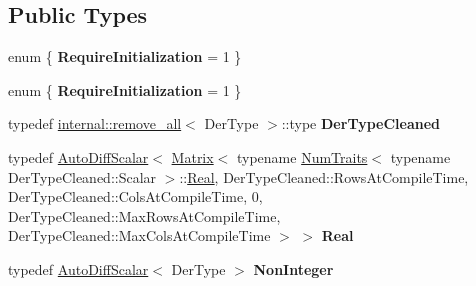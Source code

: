 \subsection*{Public Types}
\begin{DoxyCompactItemize}
\item 
\mbox{\label{struct_eigen_1_1_num_traits_3_01_auto_diff_scalar_3_01_der_type_01_4_01_4_a51eca3fcfcb445f4769c89199833101f}} 
enum \{ {\bfseries Require\+Initialization} = 1
 \}
\item 
\mbox{\label{struct_eigen_1_1_num_traits_3_01_auto_diff_scalar_3_01_der_type_01_4_01_4_ae962296cef299f5ffcd98d7b9b91edd4}} 
enum \{ {\bfseries Require\+Initialization} = 1
 \}
\item 
\mbox{\label{struct_eigen_1_1_num_traits_3_01_auto_diff_scalar_3_01_der_type_01_4_01_4_aa108a6a451dfc85fea0c4a485d8401d0}} 
typedef \hyperlink{struct_eigen_1_1internal_1_1remove__all}{internal\+::remove\+\_\+all}$<$ Der\+Type $>$\+::type {\bfseries Der\+Type\+Cleaned}
\item 
\mbox{\label{struct_eigen_1_1_num_traits_3_01_auto_diff_scalar_3_01_der_type_01_4_01_4_afa444d6af438e78c37c2089492f0f1a7}} 
typedef \hyperlink{class_eigen_1_1_auto_diff_scalar}{Auto\+Diff\+Scalar}$<$ \hyperlink{group___core___module_class_eigen_1_1_matrix}{Matrix}$<$ typename \hyperlink{group___core___module_struct_eigen_1_1_num_traits}{Num\+Traits}$<$ typename Der\+Type\+Cleaned\+::\+Scalar $>$\+::\hyperlink{group___sparse_core___module}{Real}, Der\+Type\+Cleaned\+::\+Rows\+At\+Compile\+Time, Der\+Type\+Cleaned\+::\+Cols\+At\+Compile\+Time, 0, Der\+Type\+Cleaned\+::\+Max\+Rows\+At\+Compile\+Time, Der\+Type\+Cleaned\+::\+Max\+Cols\+At\+Compile\+Time $>$ $>$ {\bfseries Real}
\item 
\mbox{\label{struct_eigen_1_1_num_traits_3_01_auto_diff_scalar_3_01_der_type_01_4_01_4_a189d1370ef670215ec26db536be0575a}} 
typedef \hyperlink{class_eigen_1_1_auto_diff_scalar}{Auto\+Diff\+Scalar}$<$ Der\+Type $>$ {\bfseries Non\+Integer}

\end{DoxyCompactItemize}
